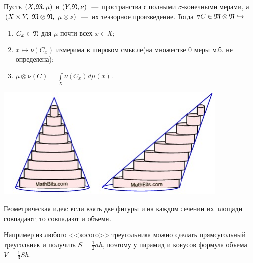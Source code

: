 \begin{theorem}
    Пусть $(X, \mathfrak{M}, \mu)$ и $(Y, \mathfrak{N}, \nu)$~---~пространства с полными $\sigma$-конечными мерами, а $(X \times Y, \ \MM \otimes \NN, \ \mu \otimes \nu)$~---~их тензорное произведение. Тогда $\forall C \in \mathfrak{M} \otimes \mathfrak{N} \hookrightarrow$
    \begin{enumerate}
        \item $C_x \in \mathfrak{N}$ для $\mu$-почти всех $x \in X$;
        \item $x \mapsto \nu(C_x)$ измерима в широком смысле(на множестве 0 меры м.б. не определена);
        \item $\mu\otimes\nu(C) = \int\limits_X \nu(C_x)d\mu(x)$.
    \end{enumerate}


\begin{minipage}{0.5\textwidth}%
    \includegraphics[width=0.85\textwidth]{images/Cavalery.jpg} 
\end{minipage}%
\hfill
\begin{minipage}{0.5\textwidth}\RaggedRight
Геометрическая идея: если взять две фигуры и на каждом сечении их площади совпадают, то совпадают и объемы.

Например из любого <<косого>> треугольника можно сделать прямоугольный треугольник и получить $S = \frac{1}{2}ah$, поэтому у пирамид и конусов формула объема $V = \frac{1}{3}Sh$.
\end{minipage}

    
\end{theorem}
